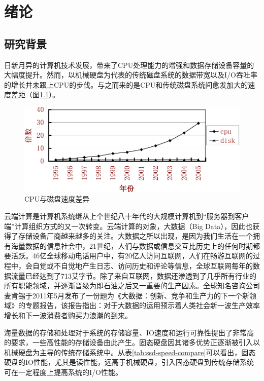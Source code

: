 
\chapter{绪论}
\label{cha:introduction}

\section{研究背景}
\label{sec:background}

日新月异的计算机技术发展，带来了CPU处理能力的增强和数据存储设备容量的大幅度提升。然而，以机械硬盘为代表的传统磁盘系统的数据带宽以及I/O吞吐率的增长并未跟上CPU的步伐。与之而来的是CPU和传统磁盘系统间愈发加大的速度差距\cite{matthews2008intelturbomem}（图\ref{fig:cpu-disk-diff}）。

\begin{figure}[H]
\centering
\includegraphics[width=0.7\linewidth]{./graph/cpu-disk-gap}
\caption{CPU与磁盘速度差异}
\label{fig:cpu-disk-diff}
\end{figure}

云端计算\cite{jimgray2003cloud}是计算机系统继从上个世纪八十年代的大规模计算机到“服务器到客户端”计算组织方式的又一次转变。云端计算的对象，大数据（Big Data），因此也获得了存储设备厂商越来越多的关注。大数据之所以出现，是因为我们生活在一个拥有海量数据的信息社会中，21世纪，人们与数据或信息交互比历史上的任何时期都要活跃。46亿全球移动电话用户中，有20亿人访问互联网，人们在畅游互联网的过程中，会自觉或不自觉地产生日志、访问历史和评论等信息，全球互联网每年的数据流量已经达到了713艾字节。除了来自互联网，数据还渗透到了几乎所有行业的所有职能领域，并逐渐晋级为即石油之后又一重要的生产因素。全球知名咨询公司麦肯锡于2011年5月发布了一份题为《大数据：创新、竞争和生产力的下一个新领域》的专题报告，该报告指出：对于大数据的运用预示着人类社会新一波生产效率增长和下一波消费者购买力浪潮的到来。

海量数据的存储和处理对于系统的存储容量、IO速度和运行可靠性提出了非常高的要求，一些高性能的存储设备由此产生。固态硬盘因其诸多优势正逐渐被引入以机械硬盘为主导的传统存储系统中\cite{morris2003evostorage}。从表\ref{tab:ssd-speed-compare}可以看出，固态硬盘的IO性能，尤其是读性能，远高于机械硬盘\cite{libo2010cacheforssd}，引入固态硬盘到传统存储系统可在一定程度上提高系统的I/O性能。

